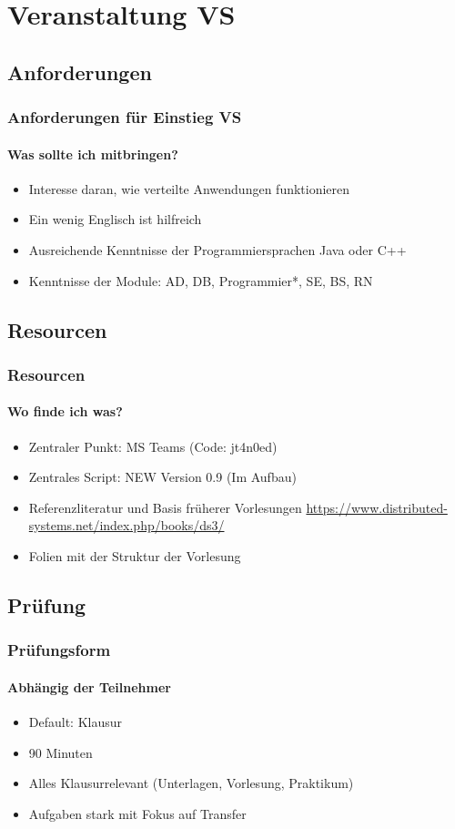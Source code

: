 \section{Veranstaltung VS}
\subsection{Anforderungen}
\begin{frame}
  \frametitle{Anforderungen für Einstieg VS}
  \framesubtitle{Was sollte ich mitbringen? }
  \begin{itemize}
    \item Interesse daran, wie verteilte Anwendungen funktionieren
    \item Ein wenig Englisch ist hilfreich
    \item Ausreichende Kenntnisse der Programmiersprachen Java oder C++
    \item Kenntnisse der Module: AD, DB, Programmier*, SE, BS, RN 
  \end{itemize}
\end{frame}
\subsection{Resourcen}
\begin{frame}
  \frametitle{Resourcen}
  \framesubtitle{Wo finde ich was?}
  \begin{itemize}
    \item Zentraler Punkt: MS Teams (Code: jt4n0ed)
    \item Zentrales Script: NEW Version 0.9 (Im Aufbau)
    \item Referenzliteratur und Basis früherer Vorlesungen \url{https://www.distributed-systems.net/index.php/books/ds3/}
    \item Folien mit der Struktur der Vorlesung 
  \end{itemize}
\end{frame}

\subsection{Prüfung}
\begin{frame}
  \frametitle{Prüfungsform}
  \framesubtitle{Abhängig der Teilnehmer}
  \begin{itemize}
    \item Default: Klausur
    \item 90 Minuten 
    \item Alles Klausurrelevant (Unterlagen, Vorlesung, Praktikum)
    \item Aufgaben stark mit Fokus auf Transfer
  \end{itemize}
\end{frame}

